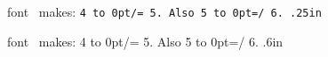 \def\trlap#1{\hbox to 0pt{#1\hss}}
{font {\tt\fontname\font}\ makes: \tt 4 \trlap/= 5. Also 5 \trlap=/ 6.
 \hbox{\kern.25in\boxitA{/}{}\kern0.25in \boxitA{=}{}}}\par
font \fontname\font\ makes: 4 \trlap/= 5. Also 5 \trlap=/ 6.
 \hbox{\kern.6in\boxitA{/}{}\kern0.25in \boxitA{=}{}}
\bye

